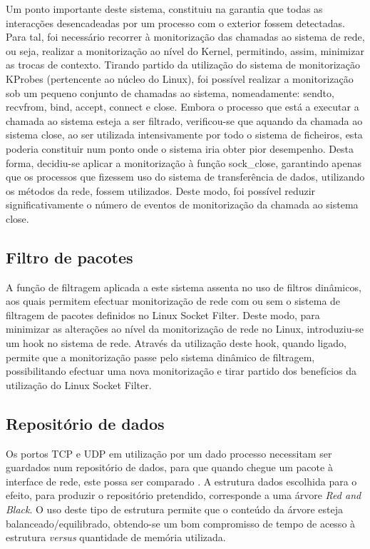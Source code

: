 \documentclass[a4paper]{llncs}
\newcommand{\td}[1]{\todo[inline]{#1}}
\begin{document}
Um ponto importante deste sistema, constituiu na garantia que todas as interacções desencadeadas por um processo com o exterior fossem detectadas. Para tal, foi necessário recorrer à monitorização das chamadas ao sistema de rede, ou seja, realizar a monitorização ao nível do Kernel, permitindo, assim, minimizar as trocas de contexto. Tirando partido da utilização do sistema de monitorização KProbes (pertencente ao núcleo do Linux), foi possível realizar a monitorização sob um pequeno conjunto de chamadas ao sistema, nomeadamente: sendto, recvfrom, bind, accept, connect e close. Embora o processo que está a executar a chamada ao sistema esteja a ser filtrado, verificou-se que aquando da chamada ao sistema close, ao ser utilizada intensivamente por todo o sistema de ficheiros, esta poderia constituir num ponto onde o sistema iria obter pior desempenho. Desta forma, decidiu-se aplicar a monitorização à função sock\_close, garantindo apenas que os processos que fizessem uso do sistema de transferência de dados, utilizando os métodos da rede, fossem utilizados. Deste modo, foi possível reduzir significativamente o número de eventos de monitorização da chamada ao sistema close.

\subsection*{Filtro de pacotes}
\label{sub:packet_filter}

A função de filtragem aplicada a este sistema assenta no uso de filtros dinâmicos, aos quais permitem efectuar monitorização de rede com ou sem o sistema de filtragem de pacotes definidos no Linux Socket Filter. Deste modo, para minimizar as alterações ao nível da monitorização de rede no Linux, introduziu-se um hook no sistema de rede. Através da utilização deste hook, quando ligado, permite que a monitorização passe pelo sistema dinâmico de filtragem, possibilitando efectuar uma nova monitorização e tirar partido dos benefícios da utilização do Linux Socket Filter.

\subsection*{Repositório de dados}
\label{sub:data_repository}

Os portos TCP e UDP em utilização por um dado processo necessitam ser guardados num repositório de dados, para que quando chegue um pacote à interface de rede, este possa ser comparado \td{explicação um pouco mais detalhada}. A estrutura dados escolhida para o efeito, para produzir o repositório pretendido, corresponde a uma árvore \textit{Red and Black}. O uso deste tipo de estrutura permite que o conteúdo da árvore esteja balanceado/equilibrado, obtendo-se um bom compromisso de tempo de acesso à estrutura \textit{versus} quantidade de memória utilizada.
\end{document}
